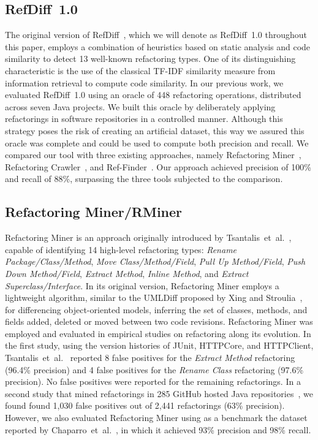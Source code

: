 \subsection{RefDiff~1.0}

The original version of RefDiff~\cite{msr2017}, which we will denote as RefDiff~1.0 throughout this paper, employs a combination of heuristics based on static analysis and code similarity to detect 13 well-known refactoring types.
One of its distinguishing characteristic is the use of the classical TF-IDF similarity measure from information retrieval to compute code similarity.
In our previous work, we evaluated RefDiff~1.0 using an oracle of 448 refactoring operations, distributed across seven Java projects.
We built this oracle by deliberately applying refactorings in software repositories in a controlled manner.
Although this strategy poses the risk of creating an artificial dataset, this way we assured this oracle was complete and could be used to compute both precision and recall.
We compared our tool with three existing approaches, namely Refactoring Miner~\cite{tsantalis_empiricalstudy}, Refactoring Crawler~\cite{dig2006automated}, and Ref-Finder~\cite{Kim:2010:RefFinder}.
Our approach achieved precision of 100\% and recall of 88\%, surpassing the three tools subjected to the comparison.


\subsection{Refactoring Miner/RMiner}

Refactoring Miner is an approach originally introduced by Tsantalis~et~al.~\cite{tsantalis_empiricalstudy}, capable of identifying 14 high-level refactoring types: \emph{Rename Package/Class/Method}, \emph{Move Class/Method/Field}, \emph{Pull Up Method/Field}, \emph{Push Down Method/Field}, \emph{Extract Method}, \emph{Inline Method}, and \emph{Extract Superclass/Interface}.
In its original version, Refactoring Miner employs a lightweight algorithm, similar to the UMLDiff proposed by Xing and Stroulia~\cite{Xing:2005}, for differencing object-oriented models, inferring the set of classes, methods, and fields added, deleted or moved between two code revisions. 
Refactoring Miner was employed and evaluated in empirical studies on refactoring along its evolution.
In the first study, using the version histories of JUnit, HTTPCore, and HTTPClient, Tsantalis~et~al.~\cite{tsantalis_empiricalstudy} reported 8 false positives for the \emph{Extract Method} refactoring (96.4\% precision) and 4 false positives for the \emph{Rename Class} refactoring (97.6\% precision). No false positives were reported for the remaining refactorings.
In a second study that mined refactorings in 285 GitHub hosted Java repositories~\cite{fse2016-why-we-refactor}, we found found 1,030 false positives out of 2,441 refactorings (63\% precision). However, we also evaluated Refactoring Miner using as a benchmark the dataset reported by Chaparro~et~al.~\cite{Chaparro:2014}, in which it achieved 93\% precision and 98\% recall.

